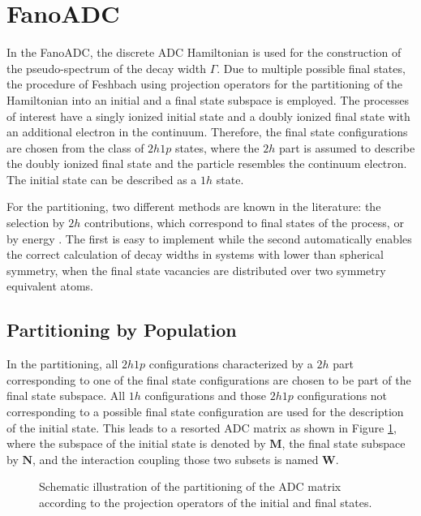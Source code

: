 \section{FanoADC}
In the FanoADC, the discrete ADC Hamiltonian 
is used for the construction of the pseudo-spectrum of the decay width
$\Gamma$.
Due to multiple possible final states, the procedure
of Feshbach using projection operators for the partitioning of the Hamiltonian
into an initial and a final state subspace is employed.
The processes of interest have a singly ionized initial state and a
doubly ionized final state with an addi\-tio\-nal electron in the continuum.
Therefore, the final state configurations are chosen from
the class of $2h1p$ states, where the $2h$ part is assumed to
describe the doubly ionized final state and the particle resembles the continuum electron.
The initial state can be described as a $1h$ state.

For the partitioning, two different methods are known in the literature:
the selection by $2h$ contributions, which correspond to final states of
the process, or by energy \cite{Averbukh05}.
The first is easy to implement while the second automatically
enables the correct calculation of decay widths in systems with lower than
spherical symmetry, when the final state vacancies are distributed over two symmetry
equivalent atoms.


\subsection{Partitioning by Population}
In the partitioning, all $2h1p$ configurations characterized by a $2h$
part corresponding to one of the
final state configurations are chosen to be part of the final state subspace.
All $1h$ configurations and those $2h1p$ configurations not corresponding
to a possible final state configuration are used for the description
of the initial state. This leads to a resorted \ac{ADC} matrix as shown in
Figure \ref{figure:fano_matsort}, where the subspace of the initial state
is denoted by $\mathbf{M}$, the final state subspace by $\mathbf{N}$, and
the interaction coupling those two subsets is named $\mathbf{W}$.

\begin{figure}[h]
  \centering
  
  \caption{Schematic illustration of the partitioning of the \ac{ADC} matrix
           according to the projection operators of the initial and final
           states.}
  \label{figure:fano_matsort}
\end{figure}

